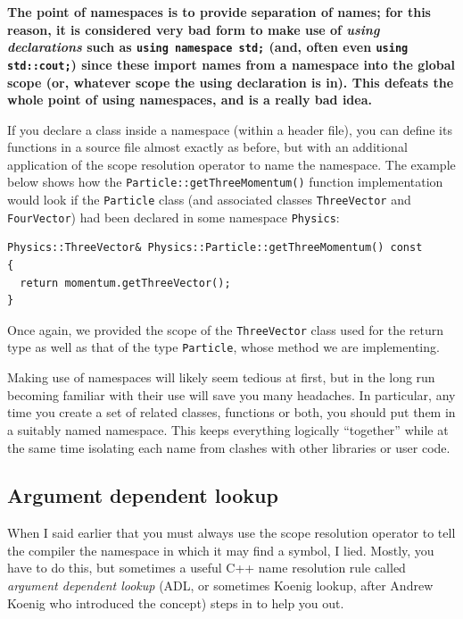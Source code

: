 \documentclass[a4paper]{scrartcl}
\begin{document}
\textbf{The point of namespaces is to provide separation of names; for this reason, it is considered very bad form to make use of \emph{using declarations} such as \texttt{using namespace std;} (and, often even \texttt{using std::cout;}) since these import names from a namespace into the global scope (or, whatever scope the using declaration is in). This defeats the whole point of using namespaces, and is a {\sc really bad idea}.}

If you declare a class inside a namespace (within a header file), you can define its functions in a source file almost exactly as before, but with an additional application of the scope resolution operator to name the namespace. The example below shows how the \texttt{Particle::getThreeMomentum()} function implementation would look if the \texttt{Particle} class (and associated classes \texttt{ThreeVector} and \texttt{FourVector}) had been declared in some namespace \texttt{Physics}:
\begin{verbatim}
Physics::ThreeVector& Physics::Particle::getThreeMomentum() const
{
  return momentum.getThreeVector();
}
\end{verbatim}

Once again, we provided the scope of the \verb|ThreeVector| class used for the return type as well as that of the type \verb|Particle|, whose method we are implementing.

Making use of namespaces will likely seem tedious at first, but in the long run becoming familiar with their use will save you many headaches. In particular, any time you create a set of related classes, functions or both, you should put them in a suitably named namespace. This keeps everything logically ``together'' while at the same time isolating each name from clashes with other libraries or user code.

\subsection{Argument dependent lookup}
When I said earlier that you must always use the scope resolution operator to tell the compiler the namespace in which it may find a symbol, I lied. Mostly, you have to do this, but sometimes a useful C++ name resolution rule called \emph{argument dependent lookup} (ADL, or sometimes Koenig lookup, after Andrew Koenig who introduced the concept) steps in to help you out.
\end{document}
